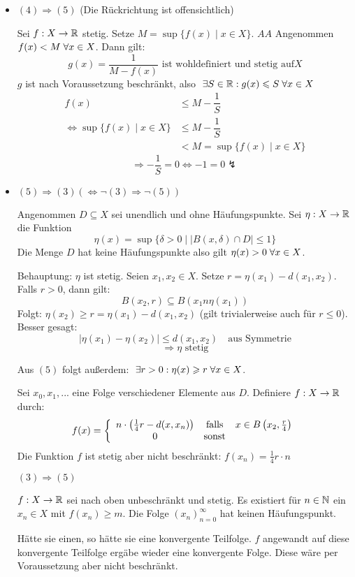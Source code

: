 \documentclass[main.tex]{subfiles}
\begin{document}
\begin{Beweis}[Teil $II$]
  \begin{itemize}
    \item $(4) \Rightarrow (5)$ (Die Rückrichtung ist offensichtlich)

      Sei $f: X \to \mathbb{R}$ stetig. Setze $M = \sup\{f(x) \mid x \in X\}$. $A\!\!\!A$ Angenommen $f(x) < M \;\forall x \in X$. Dann gilt:
      $$g(x) = \dfrac{1}{M - f(x)} \text{ ist wohldefiniert und stetig auf} X$$
      $g$ ist nach Voraussetzung beschränkt, also $\;\exists S \in \mathbb{R} : g(x) \leqslant S \;\forall x \in X$
      $$\begin{aligned}
        f(x) & \leq M - \dfrac{1}{S} \\
        \Leftrightarrow \sup \{f(x) \mid x \in X\} & \leq M - \dfrac{1}{S} \\
        & < M = \sup \{f(x) \mid x \in X\}
      \end{aligned}$$
      $$\Rightarrow -\dfrac{1}{S} = 0 \Leftrightarrow -1 = 0 \lightning$$
    \item $(5) \Rightarrow (3) (\Leftrightarrow \lnot (3) \Rightarrow \lnot (5))$

      Angenommen $D \subseteq X$ sei unendlich und ohne Häufungspunkte. Sei $\eta : X \to \mathbb{R}$ die Funktion
      $$\eta (x) = \sup \{\delta > 0 \mid |B(x, \delta) \cap D| \leq 1 \}$$
      Die Menge $D$ hat keine Häufungspunkte also gilt $\eta (x) > 0 \;\forall x \in X$.

      Behauptung: $\eta$ ist stetig. Seien $x_1, x_2 \in X$. Setze $r = \eta (x_1) - d(x_1,x_2)$. Falls $r > 0$, dann gilt:
      $$B(x_2,r) \subseteq B(x_1n\eta(x_1))$$
      Folgt: $\eta (x_2) \geq r = \eta (x_1) - d(x_1,x_2)$ (gilt trivialerweise auch für $r \leq 0$). Besser gesagt:
      $$|\eta(x_1) - \eta(x_2)| \leq d(x_1, x_2) \quad \text{aus Symmetrie}$$
      $$\Rightarrow \eta \text{ stetig}$$

      Aus $(5)$ folgt außerdem: $\;\exists r > 0 : \eta(x) \geqslant r \;\forall x \in X$.

      Sei $x_0,x_1,...$ eine Folge verschiedener Elemente aus $D$. Definiere $f: X \to \mathbb{R}$ durch:
      $$f(x) = \left\{\begin{array}{c c c}
        n \cdot \left(\frac{1}{4} r - d(x,x_n)\right) & \text{falls} & x \in B\left(x_2,\frac{r}{4}\right) \\
        0 & \text{sonst} &
      \end{array}\right.$$
      Die Funktion $f$ ist stetig aber nicht beschränkt: $f(x_n) = \frac{1}{4} r \cdot n$

      $(3) \Rightarrow (5)$

      \adabs $f: X \to \mathbb{R}$ sei nach oben unbeschränkt und stetig. Es existiert für $n \in \mathbb{N}$ ein $x_n \in X$ mit $f(x_n) \geq m$. Die Folge $(x_n)_{n=0}^\infty$ hat keinen Häufungspunkt.

      Hätte sie einen, so hätte sie eine konvergente Teilfolge. $f$ angewandt auf diese konvergente Teilfolge ergäbe wieder eine konvergente Folge. Diese wäre per Voraussetzung aber nicht beschränkt. \lightning
  \end{itemize}
\end{Beweis}
\end{document}
